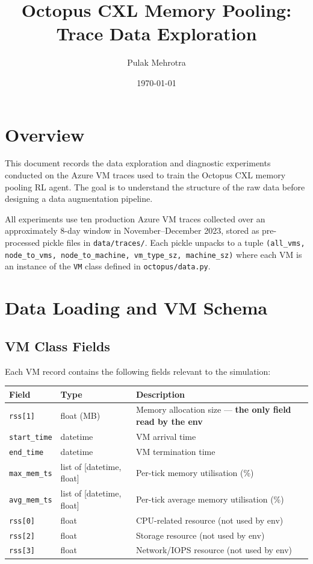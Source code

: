 \documentclass[11pt]{article}
\title{Octopus CXL Memory Pooling: Trace Data Exploration}
\author{Pulak Mehrotra}
\date{\today}
\begin{document}
\maketitle
\tableofcontents
\newpage

\section{Overview}

This document records the data exploration and diagnostic experiments
conducted on the Azure VM traces used to train the Octopus CXL memory
pooling RL agent. The goal is to understand the structure of the raw
data before designing a data augmentation pipeline.

All experiments use ten production Azure VM traces collected over an
approximately 8-day window in November--December 2023, stored as
pre-processed pickle files in \texttt{data/traces/}. Each pickle
unpacks to a tuple
\texttt{(all\_vms, node\_to\_vms, node\_to\_machine, vm\_type\_sz,
machine\_sz)} where each VM is an instance of the \texttt{VM} class
defined in \texttt{octopus/data.py}.

\section{Data Loading and VM Schema}

\subsection{VM Class Fields}

Each VM record contains the following fields relevant to the
simulation:

\begin{center}
\begin{tabular}{lll}
\toprule
Field & Type & Description \\
\midrule
\texttt{rss[1]} & float (MB) & Memory allocation size — \textbf{the only field read by the env} \\
\texttt{start\_time} & datetime & VM arrival time \\
\texttt{end\_time} & datetime & VM termination time \\
\texttt{max\_mem\_ts} & list of [datetime, float] & Per-tick memory utilisation (\%) \\
\texttt{avg\_mem\_ts} & list of [datetime, float] & Per-tick average memory utilisation (\%) \\
\texttt{rss[0]} & float & CPU-related resource (not used by env) \\
\texttt{rss[2]} & float & Storage resource (not used by env) \\
\texttt{rss[3]} & float & Network/IOPS resource (not used by env) \\
\bottomrule
\end{tabular}
\end{center}
\end{document}
